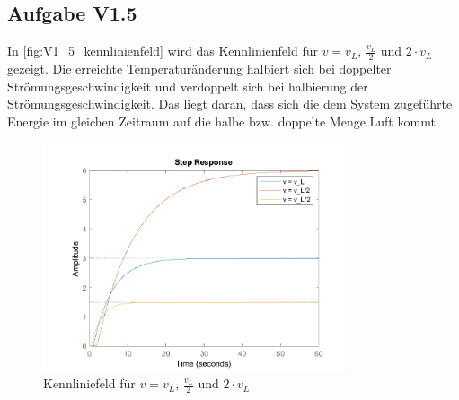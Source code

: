 \newpage

\subsection{Aufgabe V1.5}


In \autoref{fig:V1_5_kennlinienfeld} wird das Kennlinienfeld für \( v = v_L\), \(\frac{v_L}{2}\) und \(2\cdot v_L\) gezeigt. Die erreichte Temperaturänderung halbiert sich bei doppelter Strömungsgeschwindigkeit und verdoppelt sich bei halbierung der Strömungsgeschwindigkeit. Das liegt daran, dass sich die dem System zugeführte Energie im gleichen Zeitraum auf die halbe bzw. doppelte Menge Luft kommt.

\begin{figure}[H]
    \begin{center}
        \includegraphics[width=0.8\textwidth]{img/V1_5.png}
        \caption{Kennliniefeld für \( v = v_L\), \(\frac{v_L}{2}\) und \(2\cdot v_L\)}
        \label{fig:V1_5_kennlinienfeld}
    \end{center}
\end{figure}

\newpage